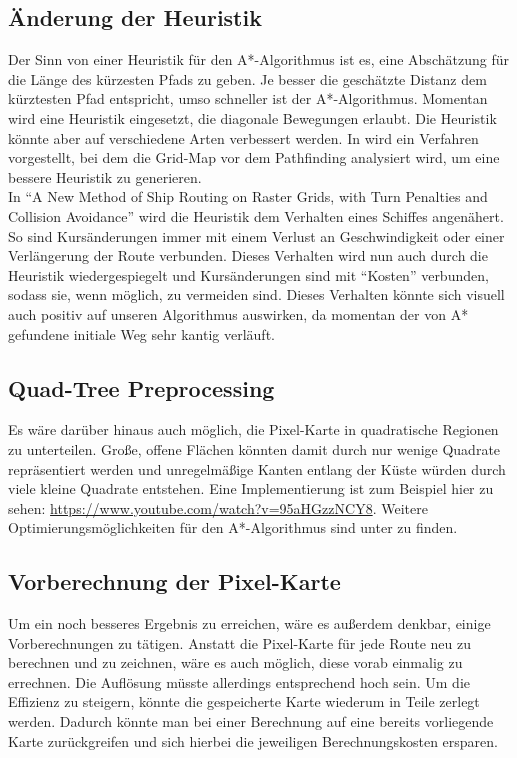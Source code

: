 \documentclass[letterpaper]{article}
\begin{document}

	\subsection{Änderung der Heuristik}
		Der Sinn von einer Heuristik für den A*-Algorithmus ist es, eine Abschätzung für die Länge des kürzesten Pfads zu geben. Je besser die geschätzte Distanz dem kürztesten Pfad entspricht, umso schneller ist der A*-Algorithmus. Momentan wird eine Heuristik eingesetzt, die diagonale Bewegungen erlaubt. Die Heuristik könnte aber auf verschiedene Arten verbessert werden. In \cite{andrew04} wird ein Verfahren vorgestellt, bei dem die Grid-Map vor dem Pathfinding analysiert wird, um eine bessere Heuristik zu generieren.\\

		In "`A New Method of Ship Routing on Raster Grids, with Turn Penalties and Collision Avoidance"'\cite{szlapczynski06} wird die Heuristik dem Verhalten eines Schiffes angenähert. So sind Kursänderungen immer mit einem Verlust an Geschwindigkeit oder einer Verlängerung der Route verbunden. Dieses Verhalten wird nun auch durch die Heuristik wiedergespiegelt und Kursänderungen sind mit "`Kosten"' verbunden, sodass sie, wenn möglich, zu vermeiden sind. Dieses Verhalten könnte sich visuell auch positiv auf unseren Algorithmus auswirken, da momentan der von A* gefundene initiale Weg sehr kantig verläuft.

	\subsection{Quad-Tree Preprocessing}
		Es wäre darüber hinaus auch möglich, die Pixel-Karte in quadratische Regionen zu unterteilen. Große, offene Flächen könnten damit durch nur wenige Quadrate repräsentiert werden und unregelmäßige Kanten entlang der Küste würden durch viele kleine Quadrate entstehen. Eine Implementierung ist zum Beispiel hier zu sehen: \url{https://www.youtube.com/watch?v=95aHGzzNCY8}. Weitere Optimierungsmöglichkeiten für den A*-Algorithmus sind unter \cite{patel16} zu finden.

	\subsection{Vorberechnung der Pixel-Karte}
		Um ein noch besseres Ergebnis zu erreichen, wäre es außerdem denkbar, einige Vorberechnungen zu tätigen. Anstatt die Pixel-Karte für jede Route neu zu berechnen und zu zeichnen, wäre es auch möglich, diese vorab einmalig zu errechnen. Die Auflösung müsste allerdings entsprechend hoch sein. Um die Effizienz zu steigern, könnte die gespeicherte Karte wiederum in Teile zerlegt werden. Dadurch könnte man bei einer Berechnung auf eine bereits vorliegende Karte zurückgreifen und sich hierbei die jeweiligen Berechnungskosten ersparen.
\end{document}
